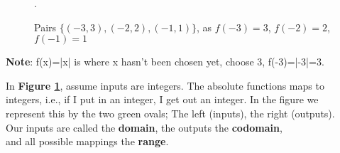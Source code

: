 \begin{figure}[ht]
    \centering
    \caption{\centering Pairs $\{(-3,3),(-2,2),(-1,1)\}$, as $f(-3)=3$, $f(-2)=2$, $f(-1)=1$}.
    \label{fig:relates}
\end{figure}

\begin{Note}
    \textbf{Note}: f(x)=|x| is where x hasn't been chosen yet, choose 3, f(-3)=|-3|=3.
\end{Note}

\noindent
In \textbf{Figure \ref{fig:relates}}, assume inputs are integers. The absolute functions maps to \\
integers, i.e., if I put in an integer, I get out an integer. In the figure we\\
represent this by the two green ovals; The left (inputs), the right (outputs).\\

\noindent
Our inputs are called the \textbf{domain}, the outputs the \textbf{codomain},\\
and all possible mappings the \textbf{range}.\\